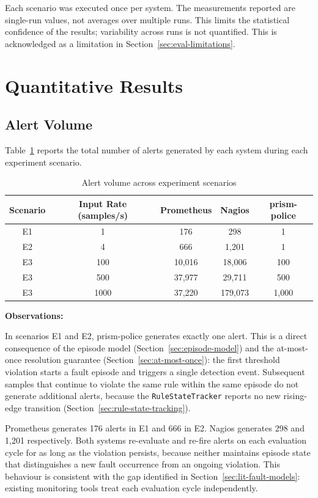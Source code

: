 Each scenario was executed once per system. The measurements reported are single-run values, not averages over multiple runs. This limits the statistical confidence of the results; variability across runs is not quantified. This is acknowledged as a limitation in Section~\ref{sec:eval-limitations}.

\section{Quantitative Results}\label{sec:quantitative-results}

\subsection{Alert Volume}

Table~\ref{tab:alert-volume} reports the total number of alerts generated by each system during each experiment scenario.

\begin{table}[htbp]
\centering
\begin{tabular}{|c|c|c|c|c|}
\hline
Scenario & Input Rate (samples/s) & Prometheus & Nagios & prism-police \\
\hline
E1 & 1 & 176 & 298 & 1 \\
E2 & 4 & 666 & 1,201 & 1 \\
E3 & 100 & 10,016 & 18,006 & 100 \\
E3 & 500 & 37,977 & 29,711 & 500 \\
E3 & 1000 & 37,220 & 179,073 & 1,000 \\
\hline
\end{tabular}
\caption{Alert volume across experiment scenarios}
\label{tab:alert-volume}
\end{table}

\textbf{Observations:}

In scenarios E1 and E2, prism-police generates exactly one alert. This is a direct consequence of the episode model (Section~\ref{sec:episode-model}) and the at-most-once resolution guarantee (Section~\ref{sec:at-most-once}): the first threshold violation starts a fault episode and triggers a single detection event. Subsequent samples that continue to violate the same rule within the same episode do not generate additional alerts, because the \texttt{RuleStateTracker} reports no new rising-edge transition (Section~\ref{sec:rule-state-tracking}).

Prometheus generates 176 alerts in E1 and 666 in E2. Nagios generates 298 and 1,201 respectively. Both systems re-evaluate and re-fire alerts on each evaluation cycle for as long as the violation persists, because neither maintains episode state that distinguishes a new fault occurrence from an ongoing violation. This behaviour is consistent with the gap identified in Section~\ref{sec:lit-fault-models}: existing monitoring tools treat each evaluation cycle independently.


